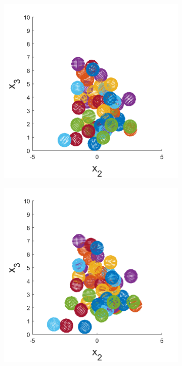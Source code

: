 \begin{figure}
\begin{subfigure}[b]{0.22\textwidth}
    \caption[]{\label{fig:squirmerPosB}}
\end{subfigure}
\begin{subfigure}[b]{0.22\textwidth}
    \centering
    \includegraphics[width=\textwidth]{Images/squirmers/Gyro-3-All.pdf}
    \caption[]{\label{fig:squirmerPosC}}
\end{subfigure}
\begin{subfigure}[b]{0.22\textwidth}
    \centering
    \includegraphics[width=\textwidth]{Images/squirmers/Gyro-4-All.pdf}

\end{subfigure}
\end{figure}
